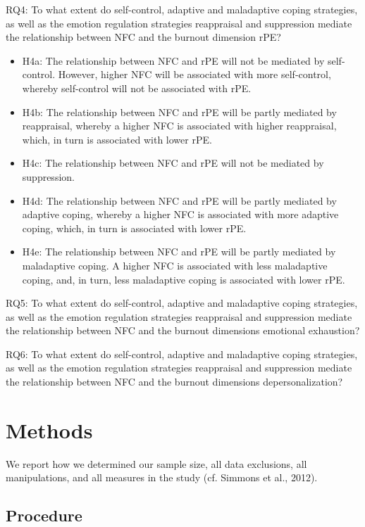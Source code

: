 \documentclass[
  man]{apa6}
\begin{document}
RQ4: To what extent do self-control, adaptive and maladaptive coping strategies, as well as the emotion regulation strategies reappraisal and suppression mediate the relationship between NFC and the burnout dimension rPE?

\begin{itemize}
\item
  H4a: The relationship between NFC and rPE will not be mediated by self-control. However, higher NFC will be associated with more self-control, whereby self-control will not be associated with rPE.
\item
  H4b: The relationship between NFC and rPE will be partly mediated by reappraisal, whereby a higher NFC is associated with higher reappraisal, which, in turn is associated with lower rPE.
\item
  H4c: The relationship between NFC and rPE will not be mediated by suppression.
\item
  H4d: The relationship between NFC and rPE will be partly mediated by adaptive coping, whereby a higher NFC is associated with more adaptive coping, which, in turn is associated with lower rPE.
\item
  H4e: The relationship between NFC and rPE will be partly mediated by maladaptive coping. A higher NFC is associated with less maladaptive coping, and, in turn, less maladaptive coping is associated with lower rPE.
\end{itemize}

RQ5: To what extent do self-control, adaptive and maladaptive coping strategies, as well as the emotion regulation strategies reappraisal and suppression mediate the relationship between NFC and the burnout dimensions emotional exhaustion?

RQ6: To what extent do self-control, adaptive and maladaptive coping strategies, as well as the emotion regulation strategies reappraisal and suppression mediate the relationship between NFC and the burnout dimensions depersonalization?

\section{Methods}\label{methods}

We report how we determined our sample size, all data exclusions, all manipulations, and all measures in the study (cf. Simmons et al., 2012).

\subsection{Procedure}\label{procedure}
\end{document}
